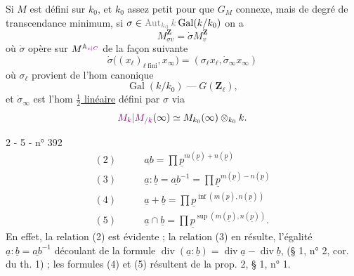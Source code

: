 
Si $M$ est défini sur  $k_0$, et $k_0$ assez petit pour que $G_M$ connexe, mais  de degré de transcendance minimum,  si $\sigma\in\deleted{\operatorname{Aut}_{k_0}k}\operatorname{Gal}(k/k_0)$
on a
\[
M_{\sigma v}^{\mathbf Z}=\dot\sigma M_v^{\mathbf Z}
\]
où $\dot\sigma$ opère sur $M^{\mathbb A_{\unsure{c|C}}}$  de la façon suivante 
\[
\dot\sigma\bigl((x_\ell)_{\ell\ \text{fini}},x_\infty\bigr)=(\sigma_\ell x_\ell,\dot\sigma_\infty x_\infty)
\]
où $\sigma_\ell$ provient de l'hom canonique
\[
\operatorname{Gal}(k/k_0)\mathbin{\text{---}}G(\mathbf Z_\ell),
\]
et $\dot\sigma_\infty$ est l'hom \uline{$\frac12$ linéaire} défini par $\sigma$ via
\[
\unsure{M_k|M_{/k}}(\infty)\simeq M_{k_0}(\infty)\otimes_{k_0}k.
\]

2 - 5 - \hfill n° 392
\[
\begin{aligned}
(2)\qquad &\underline{ab}=\prod\underline p^{m(\underline p)+n(\underline p)}\\
(3)\qquad &\underline a:\underline b=\underline{ab}^{-1}=\prod\underline p^{m(\underline p)-n(\underline p)}\\
(4)\qquad &\underline a+\underline b=\prod\underline p^{\inf(m(\underline p),n(\underline p))}\\
(5)\qquad &\underline a\cap\underline b=\prod\underline p^{\sup(m(\underline p),n(\underline p))}.
\end{aligned}
\]
En effet, la relation (2) est évidente ; la relation (3) en résulte, l'égalité $\underline a:\underline b=\underline{ab}^{-1}$ découlant de la formule $\operatorname{div}(\underline a:\underline b)=\operatorname{div}\underline a-\operatorname{div}\underline b$, (§ 1, n° 2, cor. du th. 1) ; les formules (4) et (5) résultent de la prop. 2, § 1, n° 1.

